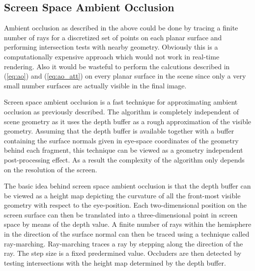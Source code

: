 \subsection{Screen Space Ambient Occlusion}
\label{sec:ssao}
Ambient occlusion as described in the above could be done by tracing a
finite number of rays for a discretized set of points on each planar
surface and performing intersection tests with nearby
geometry. Obviously this is a computationally expensive approach which
would not work in real-time rendering. Also it would be wasteful to
perform the calcutions described in (\ref{eq:ao}) and
(\ref{eq:ao_att}) on every planar surface in the scene since only a
very small number surfaces are actually visible in the final image.

Screen space ambient occlusion \citep{ssao} is a fast technique for
approximating ambient occlusion as previously described. The algorithm
is completely independent of scene geometry as it uses the depth
buffer as a rough approximation of the visible geometry. Assuming that
the depth buffer is available together with a buffer containing the
surface normals given in eye-space coordinates of the geometry
behind each fragment, this technique can be viewed as a geometry
independent post-processing effect. As a result the complexity of the
algorithm only depends on the resolution of the screen.

The basic idea behind screen space ambient occlusion is that the depth
buffer can be viewed as a height map depicting the curvature of all
the front-most visible geometry with respect to the eye-position. Each
two-dimensional position on the screen surface can then be translated
into a three-dimensional point in screen space by means of the depth
value. A finite number of rays within the hemisphere in the direction
of the surface normal can then be traced using a technique called
ray-marching. Ray-marching traces a ray by stepping along the
direction of the ray. The step size is a fixed predermined
value. Occluders are then detected by testing intersections with the
height map determined by the depth buffer.

